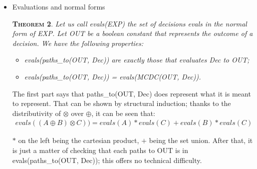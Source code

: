 \documentclass[a4paper,12pt,twoside]{article}
\newtheorem{theorem}{\textsc{Theorem}}
\newtheorem{definition}{\textsc{Definition}}
\begin{document}
\begin{itemize}
\begin{definition}
  MCDC(...) is said to be in normal form if it verifies
  the syntax of <mcdc\_nf> and if only one occurence of each decision can be
  found in the formula.
\end{definition}

Existence of normal form has been proven previously. We have a
property of unicity (modulo commutativity) that is a general property
of these expressions in linear logic:
\begin{theorem}
  \label{thm:truth-table-unicity}
  Two expressions in normal forms are say to represent the same
  truth table if you can reduce one to the other using only the
  commutativity of $\otimes$, $\oplus$, $\with$, $\parr$.

  Then, if an expression returned by BUILD\_MCDC can be reduced to two
  different expressions in normal forms, then these two normals forms
  represent the same truth table.
\end{theorem}

This is a general property of linear logic, that can be proven using
its sequent calculus. We will not detail this proof here.

\item Evaluations and normal forms
\begin{theorem}
  \label{thm:evals-and-paths}
  Let us call evals(EXP) the set of decisions evals in the normal form
  of EXP. Let OUT be a boolean constant that represents the outcome of a
  decision. We have the following properties:
  \begin{itemize}
  \item evals(paths\_to(OUT, Dec)) are exactly those that evaluates Dec to OUT;
  \item evals(paths\_to(OUT, Dec)) = evals(MCDC(OUT, Dec)).
  \end{itemize}
\end{theorem}

The first part says that paths\_to(OUT, Dec) does represent what it is
meant to represent. That can be shown by structural induction; thanks
to the distributivity of $\otimes$ over $\oplus$, it can be seen that:
\begin{align*}
  evals((A \oplus B) \otimes C))
   = evals(A) * evals(C) + evals (B) * evals (C)
\end{align*}

$*$ on the left being the cartesian product, $+$ being the set union.
After that, it is just a matter of checking that each paths to OUT is
in evals(paths\_to(OUT, Dec)); this offers no technical difficulty.


\end{itemize}
\end{document}
